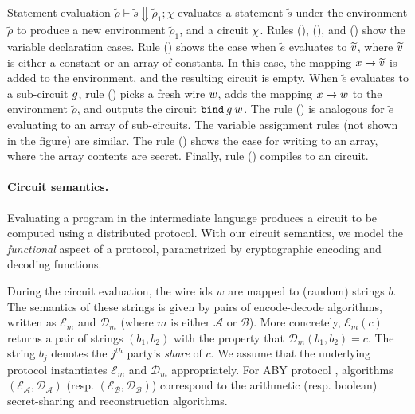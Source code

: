 Statement evaluation $\widetilde{\rho} \vdash \widetilde{s} \Downarrow
\widetilde{\rho}_{1}; \chi$ evaluates a statement $\widetilde{s}$ under 
the environment $\widetilde{\rho}$  to produce a new
environment $\widetilde{\rho}_{1}$, and a circuit $\chi$. Rules ({}), ({}), and
({}) show the variable declaration cases. Rule
({}) shows the case when $\widetilde{e}$ evaluates to
$\widetilde{v}$, where $\widetilde{v}$ is either a constant or an
array of constants. In this case, the mapping $x \mapsto
\widetilde{v}$ is added to the environment, and the resulting circuit
is empty. When 
$\widetilde{e}$ evaluates to a sub-circuit ${g}$, rule
({}) picks a fresh wire $w$, adds the mapping $x \mapsto w$
to the environment $\widetilde{\rho}$, and outputs the circuit
${\mathtt{bind}}\:{g}\:w$. The rule ({}) is analogous for
$\widetilde{e}$ evaluating to an  array of sub-circuits. The variable
assignment rules (not shown in the figure) are similar. The rule
({}) shows the case for writing to an array, where the
array contents are secret. Finally, rule ({}) compiles to an
 circuit.


\paragraph{Circuit semantics.} Evaluating a program in the
intermediate language produces a
circuit to be computed using a distributed \mpc protocol. With
our circuit semantics, we model the \emph{functional} aspect
of a \mpc protocol, parametrized by cryptographic encoding and
decoding functions.

During the circuit evaluation, the wire ids $w$ are
mapped to (random) strings $b$. The semantics of these strings is
given by pairs of encode-decode algorithms, written as
$\mathcal{E}_{m}$ and $\mathcal{D}_{m}$ (where $m$ is either
$\mathcal{A}$ or $\mathcal{B}$). 
More concretely,
$\mathcal{E}_{m}(c)$ returns a pair of strings $(b_{1}, b_{2})$
 with the property that
$\mathcal{D}_{m}(b_{1}, b_{2}) = c$. 
The string $b_j$ denotes the $j^{th}$ party's {\it share} of $c$.
We assume that the underlying \mpc
protocol instantiates $\mathcal{E}_{m}$ and $\mathcal{D}_{m}$
appropriately. For ABY protocol \cite{aby}, algorithms
$(\mathcal{E}_{\mathcal{A}},\mathcal{D}_{\mathcal{A}})$
(resp. $(\mathcal{E}_{\mathcal{B}},\mathcal{D}_{\mathcal{B}})$)
correspond to the arithmetic (resp. boolean) secret-sharing and
reconstruction algorithms.


